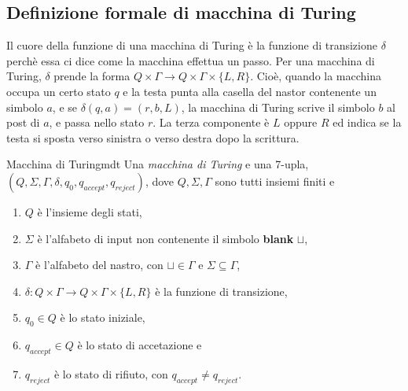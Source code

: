 \documentclass[12pt]{report}
\newcounter{definition}
\newcommand{\nmu}{}
\begin{document}
\subsection{Definizione formale di macchina di Turing}
Il cuore della funzione di una macchina di Turing è la funzione di transizione $\delta$ perchè essa ci dice come la macchina effettua un passo. Per una macchina di Turing, $\delta$ prende la forma $Q \times \Gamma \to Q \times \Gamma \times \{L, R\}$. Cioè, quando la macchina occupa un certo stato $q$ e la testa punta alla casella del nastor contenente un simbolo $a$, e se $\delta(q, a) = (r, b, L)$, la macchina di Turing scrive il simbolo $b$ al post di $a$, e passa nello stato $r$. La terza componente è $L$ oppure $R$ ed indica se la testa si sposta verso sinistra o verso destra dopo la scrittura.
\begin{definition}{\nmu Macchina di Turing}{mdt}
Una \textit{macchina di Turing} e una 7-upla, $(Q, \Sigma, \Gamma, \delta, q_0, q_{accept}, q_{reject})$, dove $Q, \Sigma, \Gamma$ sono tutti insiemi finiti e
\begin{enumerate}
	\item $Q$ è l'insieme degli stati,
	\item $\Sigma$ è l'alfabeto di input non contenente il simbolo \textbf{blank} $\sqcup$,
	\item $\Gamma$ è l'alfabeto del nastro, con $\sqcup \in \Gamma$ e $\Sigma \subseteq \Gamma$,
	\item $\delta: Q \times \Gamma \to Q \times \Gamma \times \{L, R\}$ è la funzione di transizione,
	\item $q_0 \in Q$ è lo stato iniziale,
	\item $q_{accept} \in Q$ è lo stato di accetazione e
	\item $q_{reject}$ è lo stato di rifiuto, con $q_{accept} \neq q_{reject}$.
\end{enumerate}
\end{definition}
\end{document}
